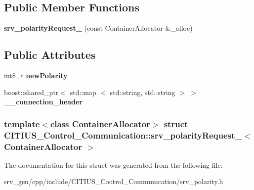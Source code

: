 \subsection*{\-Public \-Member \-Functions}
\begin{DoxyCompactItemize}
\item 
\hypertarget{struct_c_i_t_i_u_s___control___communication_1_1srv__polarity_request___a80f49d8abe828b63ec6f9c305930731b}{{\bfseries srv\-\_\-polarity\-Request\-\_\-} (const \-Container\-Allocator \&\-\_\-alloc)}\label{struct_c_i_t_i_u_s___control___communication_1_1srv__polarity_request___a80f49d8abe828b63ec6f9c305930731b}

\end{DoxyCompactItemize}
\subsection*{\-Public \-Attributes}
\begin{DoxyCompactItemize}
\item 
\hypertarget{struct_c_i_t_i_u_s___control___communication_1_1srv__polarity_request___ae689b123087aed9e6907b31f7209ecb3}{int8\-\_\-t {\bfseries new\-Polarity}}\label{struct_c_i_t_i_u_s___control___communication_1_1srv__polarity_request___ae689b123087aed9e6907b31f7209ecb3}

\item 
\hypertarget{struct_c_i_t_i_u_s___control___communication_1_1srv__polarity_request___afc67571e3916aa0b755fd535dadf4448}{boost\-::shared\-\_\-ptr$<$ std\-::map\*
$<$ std\-::string, std\-::string $>$ $>$ {\bfseries \-\_\-\-\_\-connection\-\_\-header}}\label{struct_c_i_t_i_u_s___control___communication_1_1srv__polarity_request___afc67571e3916aa0b755fd535dadf4448}

\end{DoxyCompactItemize}
\subsubsection*{template$<$class Container\-Allocator$>$ struct C\-I\-T\-I\-U\-S\-\_\-\-Control\-\_\-\-Communication\-::srv\-\_\-polarity\-Request\-\_\-$<$ Container\-Allocator $>$}



\-The documentation for this struct was generated from the following file\-:\begin{DoxyCompactItemize}
\item 
srv\-\_\-gen/cpp/include/\-C\-I\-T\-I\-U\-S\-\_\-\-Control\-\_\-\-Communication/srv\-\_\-polarity.\-h\end{DoxyCompactItemize}
